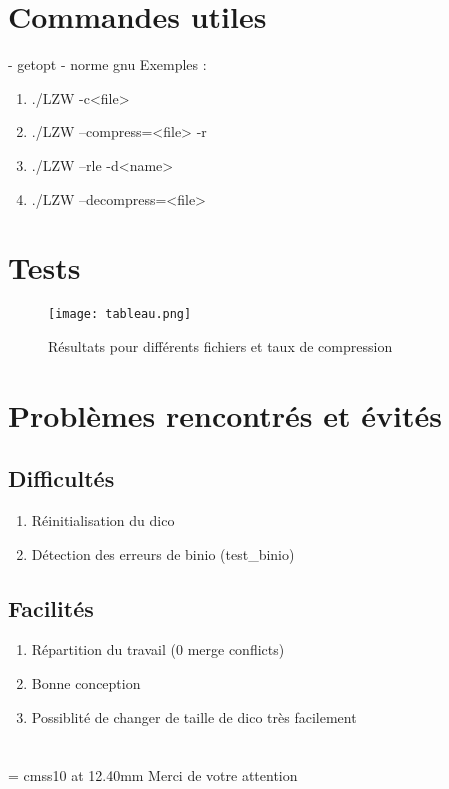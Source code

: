\documentclass{beamer}
\begin{document}
\section{Commandes utiles}


\begin{frame}
- getopt\newline
- norme gnu\newline
Exemples :
    \begin{enumerate}
    \item ./LZW -c<file>
    \item ./LZW --compress=<file> -r
    \item ./LZW --rle -d<name>
    \item ./LZW --decompress=<file>
    \end{enumerate}
\end{frame}

\section{Tests}

\begin{frame}
    \begin{figure}[h]
    \centering
    \texttt{[image: tableau.png]}
    \caption{Résultats pour différents fichiers et taux de compression}
    \label{resultats}
    \end{figure}
\end{frame}


\section{Problèmes rencontrés et évités}
\subsection{Difficultés}
\begin{frame}
 \begin{enumerate}
  \item Réinitialisation du dico
  \item Détection des erreurs de binio (test\_binio)
 \end{enumerate}
\end{frame}

\subsection{Facilités}
\begin{frame}
 \begin{enumerate}
  \item Répartition du travail (0 merge conflicts)
  \item Bonne conception
  \item Possiblité de changer de taille de dico très facilement
 \end{enumerate}
\end{frame}

\section{}
\begin{frame}
  \begin{center}
  \font\endfont = cmss10 at 12.40mm
  \color{Brown}
  \endfont
  \baselineskip 20.0mm
  Merci de votre attention
  \end{center}

\end{frame}
\end{document}
